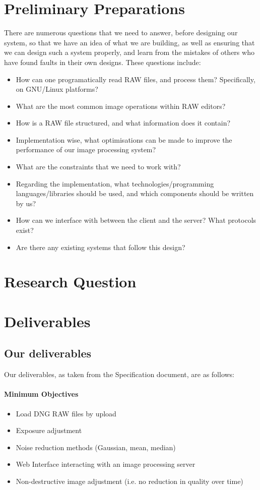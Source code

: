 \documentclass[14pt]{article}
\begin{document}
\section{Preliminary Preparations}
  There are numerous questions that we need to answer, before designing our system, so that we have an idea of what we are building,
  as well as ensuring that we can design such a system properly, and learn from the mistakes of others who have found faults in their own designs.
  These questions include:
  \begin{itemize}
    \item How can one programatically read RAW files, and process them? Specifically, on GNU/Linux platforms?
    \item What are the most common image operations within RAW editors?
    \item How is a RAW file structured, and what information does it contain?
    \item Implementation wise, what optimisations can be made to improve the performance of our image processing system?
    \item What are the constraints that we need to work with?
    \item Regarding the implementation, what technologies/programming languages/libraries should be used, and which components should be written by us?
    \item How can we interface with between the client and the server? What protocols exist?
    \item Are there any existing systems that follow this design?
  \end{itemize}
\section{Research Question}

\section{Deliverables}
  \subsection{Our deliverables}
    Our deliverables, as taken from the Specification document, are as follows:

  \paragraph{Minimum Objectives}
      \begin{itemize}
        \item Load DNG RAW files by upload
        \item Exposure adjustment
        \item Noise reduction methods (Gaussian, mean, median)
        \item Web Interface interacting with an image processing server
        \item Non-destructive image adjustment (i.e. no reduction in quality over time)
      \end{itemize}
\end{document}
